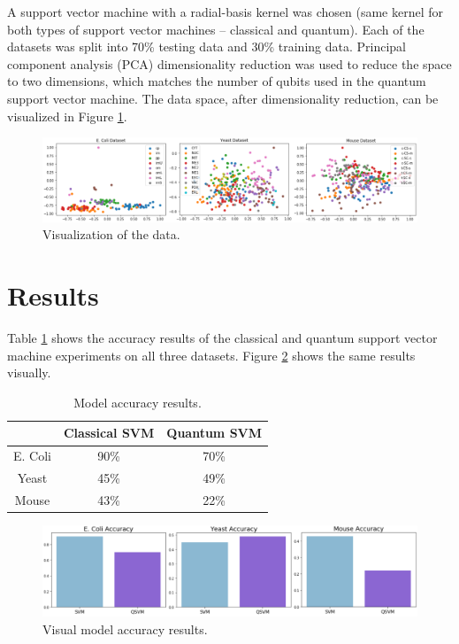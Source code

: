 \documentclass{article}
\begin{document}
  A support vector machine with a radial-basis kernel was chosen (same kernel for both types of support vector machines -- classical and quantum). Each of the datasets was split into 70\% testing data and 30\% training data. Principal component analysis (PCA) dimensionality reduction was used to reduce the space to two dimensions, which matches the number of qubits used in the quantum support vector machine. The data space, after dimensionality reduction, can be visualized in Figure \ref{fig:data}.

  \begin{figure}[h]
    \centering
    \includegraphics[width=1\textwidth]{data.png}
    \caption{\label{fig:data}Visualization of the data.}
  \end{figure}

\section{Results}
  Table \ref{table:accuracy} shows the accuracy results of the classical and quantum support vector machine experiments on all three datasets. Figure \ref{fig:results} shows the same results visually. \\

  \begin{table}[h]
    \centering
    \begin{tabular}{c|c|c|}
    \cline{2-3}
                                  & Classical SVM & Quantum SVM \\ \hline
    \multicolumn{1}{|c|}{E. Coli} & 90\%          & 70\%        \\ \hline
    \multicolumn{1}{|c|}{Yeast}   & 45\%          & 49\%        \\ \hline
    \multicolumn{1}{|c|}{Mouse}   & 43\%          & 22\%        \\ \hline
    \end{tabular}
    \caption{\label{table:accuracy}Model accuracy results.}
  \end{table}

  \hfill \break

  \begin{figure}[h]
    \centering
    \includegraphics[width=1\textwidth]{accuracy.png}
    \caption{\label{fig:results}Visual model accuracy results.}
  \end{figure}
\end{document}
